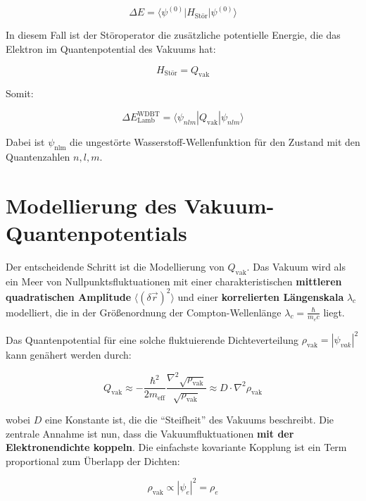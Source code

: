 \begin{equation}
    \Delta E = \langle \psi^{(0)} | H_{\text{Stör}} | \psi^{(0)} \rangle
\end{equation}

In diesem Fall ist der Störoperator die zusätzliche potentielle Energie, die das Elektron im Quantenpotential des Vakuums hat:

\begin{equation}
    H_{\text{Stör}} = Q_{\text{vak}}
\end{equation}

Somit:

\begin{equation}
    \Delta E_{\text{Lamb}}^{\text{WDBT}} = \langle \psi_{nlm} | Q_{\text{vak}} | \psi_{nlm} \rangle
\end{equation}

Dabei ist $\psi_\text{nlm}$ die ungestörte Wasserstoff-Wellenfunktion für den Zustand mit den Quantenzahlen $n,l,m$.

\section{Modellierung des Vakuum-Quantenpotentials}
Der entscheidende Schritt ist die Modellierung von $Q_\text{vak}$. Das Vakuum wird als ein Meer von Nullpunktsfluktuationen mit einer charakteristischen \textbf{mittleren quadratischen Amplitude}
$\langle (\delta \vec{r})^2 \rangle$ und einer \textbf{korrelierten Längenskala} $\lambda_c$ modelliert, die in der Größenordnung der Compton-Wellenlänge $\lambda_c = \frac{\hbar}{m_e c}$ liegt.

Das Quantenpotential für eine solche fluktuierende Dichteverteilung $\rho_\text{vak}= \left|\psi_{vak}\right|^2$ kann genähert werden durch:

\begin{equation}
    Q_{\text{vak}} \approx -\frac{\hbar^2}{2m_{\text{eff}}} \frac{\nabla^2 \sqrt{\rho_{\text{vak}}}}{\sqrt{\rho_{\text{vak}}}} \approx D \cdot \nabla^2 \rho_{\text{vak}}
\end{equation}

wobei $D$ eine Konstante ist, die die \enquote{Steifheit} des Vakuums beschreibt. Die zentrale Annahme ist nun, dass die Vakuumfluktuationen \textbf{mit der Elektronendichte koppeln}. Die einfachste
kovariante Kopplung ist ein Term proportional zum Überlapp der Dichten:

\begin{equation}
    \rho_\text{vak} \propto \left| \psi_e \right|^2 = \rho_e
\end{equation}

